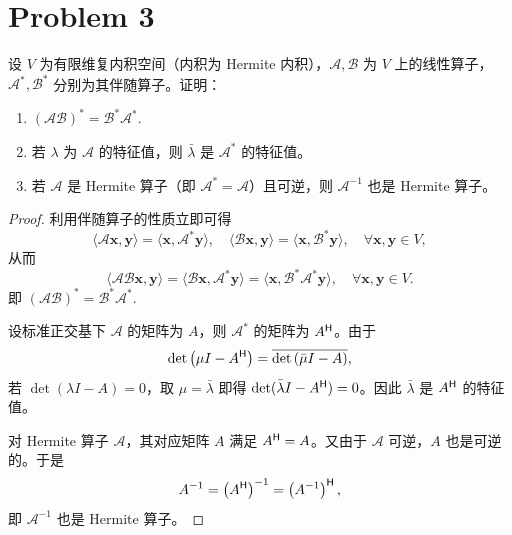 \section*{Problem 3}

设 $V$ 为有限维复内积空间（内积为 Hermite 内积），$\mathcal{A}, \mathcal{B}$ 为 $V$ 上的线性算子，$\mathcal{A^*}, \mathcal{B^*}$ 分别为其伴随算子。证明：

\begin{enumerate}
    \item $\left(\mathcal{AB}\right)^* = \mathcal{B^*}\mathcal{A^*}.$
    \item 若 $\lambda$ 为 $\mathcal{A}$ 的特征值，则 $\bar\lambda$ 是 $\mathcal{A^*}$ 的特征值。
    \item 若 $\mathcal{A}$ 是 Hermite 算子（即 $\mathcal{A^*} = \mathcal{A}$）且可逆，则 $\mathcal{A}^{-1}$ 也是 Hermite 算子。
\end{enumerate}

\begin{proof}
    利用伴随算子的性质立即可得 \[
        \langle \mathcal{A} \bm{x}, \bm{y} \rangle = \langle \bm{x}, \mathcal{A^*} \bm{y} \rangle, \quad \langle \mathcal{B} \bm{x}, \bm{y} \rangle = \langle \bm{x}, \mathcal{B^*} \bm{y} \rangle, \quad \forall \bm{x}, \bm{y} \in V,
    \]
    从而 \[
        \langle \mathcal{AB} \bm{x}, \bm{y} \rangle = \langle \mathcal{B} \bm{x}, \mathcal{A^*} \bm{y} \rangle = \langle \bm{x}, \mathcal{B^*} \mathcal{A^*} \bm{y} \rangle, \quad \forall \bm{x}, \bm{y} \in V.
    \]
    即 $\left(\mathcal{AB}\right)^* = \mathcal{B^*}\mathcal{A^*}.$

    设标准正交基下 $\mathcal{A}$ 的矩阵为 $A$，则 $\mathcal{A^*}$ 的矩阵为 $A^{\mathsf{H}}$。由于
    \[
        \det\left(\mu I-A^{\mathsf{H}}\right)
        =\overline{\det\left(\bar\mu I-A\right)},
    \]
    若 $\det(\lambda I-A)=0$，取 $\mu=\bar\lambda$ 即得
    $\det(\bar\lambda I-A^{\mathsf{H}})=0$。因此 $\bar\lambda$ 是 $A^{\mathsf{H}}$ 的特征值。

    对 Hermite 算子 $\mathcal{A}$，其对应矩阵 $A$ 满足 $A^{\mathsf{H}} = A$。又由于 $\mathcal{A}$ 可逆，$A$ 也是可逆的。于是 \[
        A^{-1} = \left(A^{\mathsf{H}}\right)^{-1} = \left(A^{-1}\right)^{\mathsf{H}},
    \]
    即 $\mathcal{A}^{-1}$ 也是 Hermite 算子。

\end{proof}
